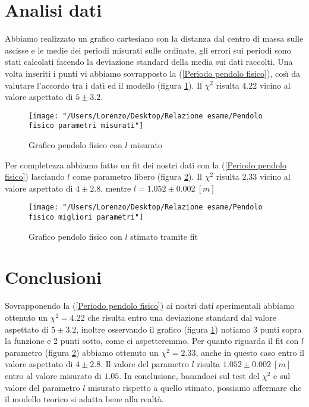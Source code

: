 \documentclass{article}
\begin{document}
		\section{Analisi dati}
			Abbiamo realizzato un grafico cartesiano con la distanza dal centro di massa sulle ascisse e le medie dei periodi misurati sulle ordinate, gli errori sui periodi sono stati calcolati facendo la deviazione standard della media sui dati raccolti. Una volta inseriti i punti vi abbiamo sovrapposto la (\ref{Periodo pendolo fisico}), cos\`{\i} da valutare l'accordo tra i dati ed il modello (figura \ref{fig:pendolo-fisico-parametri-misurati}). Il $\chi^2$ risulta $4.22$ vicino al valore aspettato di $5\pm3.2$.
			\begin{figure}
				\centering
				\texttt{[image: "/Users/Lorenzo/Desktop/Relazione esame/Pendolo fisico parametri misurati"]}
				\caption{Grafico pendolo fisico con $l$ misurato}
				\label{fig:pendolo-fisico-parametri-misurati}
			\end{figure}
			Per completezza abbiamo fatto un fit dei nostri dati con la (\ref{Periodo pendolo fisico}) lasciando $l$ come parametro libero (figura \ref{fig:pendolo-fisico-migliori-parametri}). Il $\chi^2$ risulta $2.33$ vicino al valore aspettato di $4\pm2.8$, mentre $l = 1.052\pm0.002\:[m]$
			\begin{figure}
				\centering
				\texttt{[image: "/Users/Lorenzo/Desktop/Relazione esame/Pendolo fisico migliori parametri"]}
				\caption{Grafico pendolo fisico con $l$ stimato tramite fit}
				\label{fig:pendolo-fisico-migliori-parametri}
			\end{figure}
		
		\section{Conclusioni}
			Sovrapponendo la (\ref{Periodo pendolo fisico}) ai nostri dati sperimentali abbiamo ottenuto un $\chi^2 = 4.22$ che risulta entro una deviazione standard dal valore aspettato di $5\pm3.2$, inoltre osservando il grafico (figura \ref{fig:pendolo-fisico-parametri-misurati}) notiamo 3 punti sopra la funzione e 2 punti sotto, come ci aspetteremmo.
			Per quanto riguarda il fit con $l$ parametro (figura \ref{fig:pendolo-fisico-migliori-parametri}) abbiamo ottenuto un $\chi^2 = 2.33$, anche in questo caso entro il valore aspettato di $4\pm2.8$. Il valore del parametro $l$ risulta $1.052\pm0.002\:[m]$ entro al valore misurato di $1.05$. In conclusione, basandoci sul test del $\chi^2$ e sul valore del parametro $l$ misurato rispetto a quello stimato, possiamo affermare che il modello teorico si adatta bene alla realt\`{a}.
\end{document}
